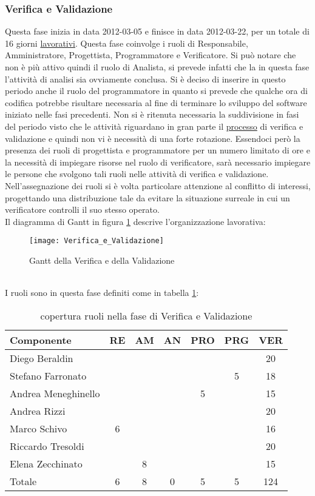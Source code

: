 \subsubsection{Verifica e Validazione}
Questa fase inizia in data 2012-03-05 e finisce in data 2012-03-22, per un totale di 16 giorni \underline{lavorativi}.
Questa fase coinvolge i ruoli di Responsabile, Amministratore, Progettista, Programmatore e Verificatore. Si può notare che non è più attivo quindi il ruolo di Analista, si prevede infatti che la in questa fase l’attività di analisi sia ovviamente conclusa.
Si è deciso di inserire  in questo periodo anche il ruolo del programmatore in quanto si prevede che qualche ora di codifica potrebbe risultare necessaria al fine di terminare lo sviluppo del software iniziato nelle fasi precedenti.
Non si è ritenuta necessaria la suddivisione in fasi del periodo visto che le attività riguardano in gran parte il \underline{processo} di verifica e validazione e quindi non vi è necessità di una forte rotazione.
Essendoci però la presenza dei ruoli di progettista e programmatore per un numero limitato di ore e la necessità di impiegare risorse nel ruolo di verificatore, sarà necessario impiegare le persone che svolgono tali ruoli nelle attività di verifica e validazione.  
Nell’assegnazione dei ruoli si è volta particolare attenzione al conflitto di interessi,  progettando una distribuzione tale da evitare la situazione surreale in cui un verificatore controlli il suo stesso operato.\\
Il diagramma di Gantt in figura \ref{fig:gantvv} descrive l'organizzazione lavorativa:\\
\begin{figure}[h!]
  \texttt{[image: Verifica\_e\_Validazione]}
\caption{Gantt della Verifica e della Validazione}\label{fig:gantvv}
\end{figure}\\
I ruoli sono in questa fase definiti come in tabella \ref{tab:ruolivv}:\\
\begin{table}[h!]
\centering
\begin{tabular}{|l|c|c|c|c|c|c|}
\hline
Componente& RE& AM& AN& PRO& PRG& VER\\
\hline
Diego Beraldin & & & & & & 20\\
Stefano Farronato & & & & & 5& 18\\
Andrea Meneghinello & & & & 5& & 15\\
Andrea Rizzi & & & & & & 20\\
Marco Schivo & 6& & & & & 16\\
Riccardo Tresoldi & & & & & & 20\\
Elena Zecchinato & & 8& & & & 15\\
\hline
Totale & 6& 8& 0& 5& 5& 124\\
\hline
\end{tabular}
\caption{copertura ruoli nella fase di Verifica e Validazione}\label{tab:ruolivv}
\end{table}
